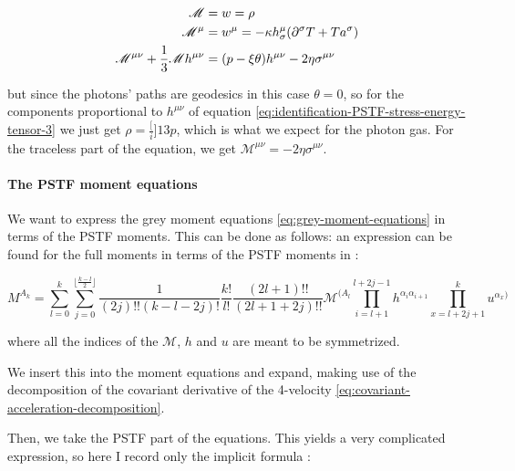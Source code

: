 \documentclass[main.tex]{subfiles}
\begin{document}
\begin{subequations}
\begin{align}
  \mathscr M &= w = \rho  \label{eq:identification-PSTF-stress-energy-tensor-1}\\
  \mathscr M ^\mu &= w^\mu = -\kappa h^\mu _\sigma  \qty(\partial^\sigma T + T a^\sigma) \label{eq:identification-PSTF-stress-energy-tensor-2}\\
  \mathscr M^{\mu\nu} + \frac{1}{3} \mathscr M h^{\mu\nu}
  &= (p - \xi \theta)h^{\mu\nu} - 2 \eta \sigma^{\mu\nu} \label{eq:identification-PSTF-stress-energy-tensor-3}
\end{align}
\end{subequations}

but since the photons' paths are geodesics in this case \(\theta = 0\), so for the components proportional to \(h^{\mu\nu}\) of equation \eqref{eq:identification-PSTF-stress-energy-tensor-3} we just get \(\rho = \frac[i]{1}{3} p\), which is what we expect for the photon gas.
For the traceless part of the equation, we get \(\mathscr M ^{\mu\nu} = -2 \eta \sigma^{\mu\nu}\).

\paragraph{The PSTF moment equations}

We want to express the grey moment equations \eqref{eq:grey-moment-equations} in terms of the PSTF moments. This can be done as follows: an expression can be found for the full moments in terms of the PSTF moments in \cite[eq. 4.10c]{Thorne:1981feb}:

\begin{equation}
  M^{A_k} = \sum_{l=0}^k \sum_{j=0}^{\lfloor \frac{k-l}{2} \rfloor}
  \frac{1}{(2j)!! (k-l-2j)!}  \frac{k!}{l!} \frac{(2l+1)!!}{(2l+1+2j)!!}
  \mathscr M^{(A_l} \prod_{i=l+1}^{l+2j-1} h^{\alpha_i \alpha_{i+1}}
  \prod_{x=l+2j+1}^k u^{\alpha_x)}
\end{equation}

where all the indices of the \(\mathscr M\), \(h\) and \(u\) are meant to be symmetrized.

We insert this into the moment equations and expand, making use of the decomposition of the covariant derivative of the 4-velocity \eqref{eq:covariant-acceleration-decomposition}.

Then, we take the PSTF part of the equations. This yields a very complicated expression, so here I record only the implicit formula \cite[eq. 4.11c]{Thorne:1981feb}:
\end{document}

